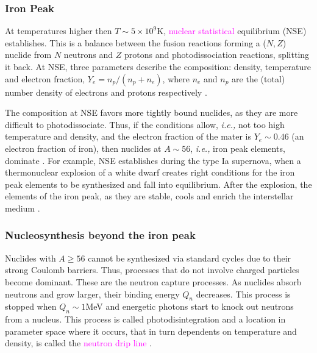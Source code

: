 \documentclass[11pt,a4paper,headinclude=true,DIV=14,BCOR=8mm,chapterprefix,listof=totoc,twoside,openright,abstracton]{scrbook}
\newcommand{\magenta}[1]{\textcolor{magenta}{#1}} %
\begin{document}

\subsubsection{Iron Peak}

At temperatures higher then $T\sim 5\times10^{9}$K, \magenta{nuclear statistical} equilibrium (NSE) establishes. This is a balance between the fusion reactions forming a ($N,Z$) nuclide from $N$ neutrons and $Z$ protons and photodissociation reactions, splitting it back. 
At NSE, three parameters describe the composition: density, temperature and electron fraction, $Y_e = n_p/(n_p + n_e)$, where $n_e$ and $n_p$ are the (total) number density of electrons and protons respectively \cite{Seitenzahl:2009}. 

The composition at NSE favors more tightly bound nuclides, as they are more difficult to photodissociate. Thus, if the conditions allow, \textit{i.e.,} not too high temperature and density, and the electron fraction of the mater is $Y_e \sim 0.46$ (an electron fraction of iron), then nuclides at $A\sim56$, \textit{i.e.,} iron peak elements, dominate \cite{Seitenzahl:2009}. 
For example, NSE establishes during the type Ia supernova, when a thermonuclear explosion of a white dwarf creates right conditions for the iron peak elements to be synthesized and fall into equilibrium. After the explosion, the elements of the iron peak, as they are stable, cools and enrich the interstellar medium \cite{Iwamoto:2000as}. 


\subsubsection{Nucleosynthesis beyond the iron peak}

Nuclides with $A\geq 56$ cannot be synthesized via standard cycles due to their strong Coulomb barriers. Thus, processes that do not involve charged particles become dominant. These are the neutron capture processes.
As nuclides absorb neutrons and grow larger, their binding energy $Q_n$ decreases. This process is stopped when $Q_n\sim1$MeV and energetic photons start to knock out neutrons from a nucleus. This process is called photodisintegration and a location in parameter space where it occurs, that in turn dependents on temperature and density, is called the \magenta{neutron drip line} \cite{Rolfs:1988}.
\end{document}
